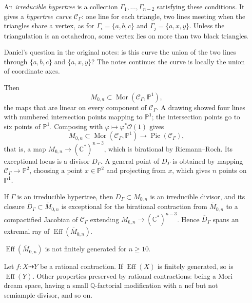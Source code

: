 An \emph{irreducible hypertree} is a
collection $\Gamma_1,\ldots,\Gamma_{n-2}$
satisfying these conditions. It gives a
\emph{hypertree curve} $\mathcal{C}_\Gamma$:
one line for each triangle, two lines
meeting when the triangles share a vertex,
as for $\Gamma_i=\{a,b,c\}$ and
$\Gamma_j=\{a,x,y\}$. Unless the
triangulation is an octahedron, some vertex
lies on more than two black triangles.

Daniel's question in the original notes: is
this curve the union of the two lines
through $\{a,b,c\}$ and $\{a,x,y\}$? The
notes continue: the curve is locally the
union of coordinate axes.

Then
$$
M_{0,n}\subset
\operatorname{Mor}(\mathcal{C}_\Gamma,
\mathbb{P}^1),
$$
the maps that are linear on every component
of $\mathcal{C}_\Gamma$. A drawing showed
four lines with numbered intersection
points mapping to $\mathbb{P}^1$; the
intersection points go to six points of
$\mathbb{P}^1$. Composing with
$\varphi\mapsto\varphi^*\mathcal{O}(1)$
gives
$$
M_{0,n}\subset
\operatorname{Mor}(\mathcal{C}_\Gamma,
\mathbb{P}^1)\to
\operatorname{Pic}(\mathcal{C}_\Gamma),
$$
that is, a map
$M_{0,n}\to(\mathbb{C}^*)^{n-3}$, which is
birational by Riemann--Roch. Its exceptional
locus is a divisor $D_\Gamma$. A general
point of $D_\Gamma$ is obtained by mapping
$\mathcal{C}_\Gamma\to\mathbb{P}^2$,
choosing a point $x\in\mathbb{P}^2$ and
projecting from $x$, which gives $n$ points
on $\mathbb{P}^1$.

\begin{theorem}
\label{theorem-tevelev-hypertree-divisor}
If $\Gamma$ is an irreducible hypertree,
then $D_\Gamma\subset M_{0,n}$ is an
irreducible divisor, and its closure
$\overline{D}_\Gamma\subset
\overline{M}_{0,n}$ is exceptional for the
birational contraction from
$\overline{M}_{0,n}$ to a compactified
Jacobian of $\mathcal{C}_\Gamma$ extending
$M_{0,n}\to(\mathbb{C}^*)^{n-3}$. Hence
$\overline{D}_\Gamma$ spans an extremal ray
of $\operatorname{Eff}(\overline{M}_{0,n})$.
\end{theorem}

\begin{theorem}
\label{theorem-tevelev-not-polyhedral}
$\operatorname{Eff}(\overline{M}_{0,n})$ is
not finitely generated for $n\geq 10$.
\end{theorem}

\begin{lemma}
\label{lemma-tevelev-rational-contraction}
Let $f\colon X\dashrightarrow Y$ be a
rational contraction. If
$\operatorname{Eff}(X)$ is finitely
generated, so is $\operatorname{Eff}(Y)$.
Other properties preserved by rational
contractions: being a Mori dream space,
having a small $\mathbb{Q}$-factorial
modification with a nef but not semiample
divisor, and so on.
\end{lemma}

